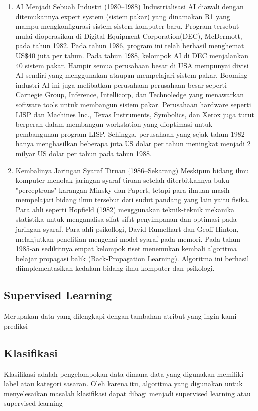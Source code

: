 \documentclass{article}
\begin{document}
\begin{enumerate}
	\item AI Menjadi Sebuah Industri (1980–1988)
	\hfill\break
	Industrialisasi AI diawali dengan ditemukannya expert system (sistem pakar) yang dinamakan R1 yang mampu mengkonfigurasi sistem-sistem komputer baru. Program tersebut mulai dioperasikan di Digital Equipment Corporation(DEC), McDermott, pada tahun 1982. Pada tahun 1986, program ini telah berhasil menghemat US\$40 juta per tahun. Pada tahun 1988, kelompok AI di DEC menjalankan 40 sistem pakar. Hampir semua perusahaan besar di USA mempunyai divisi AI sendiri yang menggunakan ataupun mempelajari sistem pakar. Booming industri AI ini juga melibatkan perusahaan-perusahaan besar seperti Carnegie Group, Inference, Intellicorp, dan Technoledge yang menawarkan software tools untuk membangun sistem pakar. Perusahaan hardware seperti LISP dan Machines Inc., Texas Instruments, Symbolics, dan Xerox juga turut berperan dalam membangun workstation yang dioptimasi untuk pembangunan program LISP. Sehingga, perusahaan yang sejak tahun 1982 hanya menghasilkan beberapa juta US dolar per tahun meningkat menjadi 2 milyar US dolar per tahun pada tahun 1988.

	\item Kembalinya Jaringan Syaraf Tiruan (1986–Sekarang)
	\hfill\break
	Meskipun bidang ilmu komputer menolak jaringan syaraf tiruan setelah diterbitkannya buku "perceptrons" karangan Minsky dan Papert, tetapi para ilmuan masih mempelajari bidang ilmu tersebut dari sudut pandang yang lain yaitu fisika. Para ahli seperti Hopfield (1982) menggunakan teknik-teknik mekanika statistika untuk menganalisa sifat-sifat penyimpanan dan optimasi pada jaringan syaraf. Para ahli psikollogi, David Rumelhart dan Geoff Hinton, melanjutkan penelitian mengenai model syaraf pada memori. Pada tahun 1985-an sedikitnya empat kelompok riset menemukan kembali algoritma belajar propagasi balik (Back-Propagation Learning). Algoritma ini berhasil diimplementasikan kedalam bidang ilmu komputer dan psikologi.

\end{enumerate}
\subsection{Supervised Learning}
\hfill\break
Merupakan data yang dilengkapi dengan tambahan atribut yang ingin kami prediksi
\subsection{Klasifikasi}
\hfill\break Klasifikasi adalah pengelompokan data dimana data yang digunakan memiliki label atau kategori sasaran. Oleh karena itu, algoritma yang digunakan untuk menyelesaikan masalah klasifikasi dapat dibagi menjadi supervised learning atau supervised learning
\end{document}
